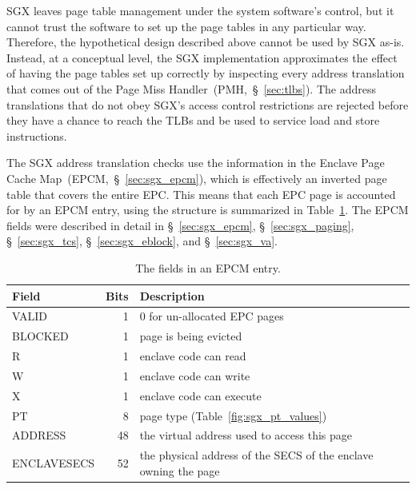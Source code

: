 SGX leaves page table management under the system software's control, but it
cannot trust the software to set up the page tables in any particular way.
Therefore, the hypothetical design described above cannot be used by SGX as-is.
Instead, at a conceptual level, the SGX implementation approximates the effect
of having the page tables set up correctly by inspecting every address
translation that comes out of the Page Miss Handler~(PMH,~\S~\ref{sec:tlbs}).
The address translations that do not obey SGX's access control restrictions
are rejected before they have a chance to reach the TLBs and be used to service
load and store instructions.


The SGX address translation checks use the information in the Enclave Page
Cache Map~(EPCM,~\S~\ref{sec:sgx_epcm}), which is effectively an inverted page
table that covers the entire EPC. This means that each EPC page is accounted
for by an EPCM entry, using the structure is summarized in
Table~\ref{fig:sgx_epcm_entry}. The EPCM fields were described in detail in
\S~\ref{sec:sgx_epcm}, \S~\ref{sec:sgx_paging}, \S~\ref{sec:sgx_tcs},
\S~\ref{sec:sgx_eblock}, and \S~\ref{sec:sgx_va}.

\begin{table}[hbt]
  \centering
  \begin{tabularx}{\columnwidth}{| l | r | X |}
  \hline
  \textbf{Field} & \textbf{Bits} & \textbf{Description}\\
  \hline
  VALID & 1 & 0 for un-allocated EPC pages \\
  \hline
  BLOCKED & 1 & page is being evicted \\
  \hline
  R & 1 & enclave code can read \\
  \hline
  W & 1 & enclave code can write \\
  \hline
  X & 1 & enclave code can execute \\
  \hline
  PT & 8 & page type (Table~\ref{fig:sgx_pt_values}) \\
  \hline
  ADDRESS & 48 & the virtual address used to access this page \\
  \hline
  ENCLAVESECS & 52 & the physical address of the SECS of the enclave owning the
                     page \\
  \hline
  \end{tabularx}
  \caption{
    The fields in an EPCM entry.
  }
  \label{fig:sgx_epcm_entry}
\end{table}

